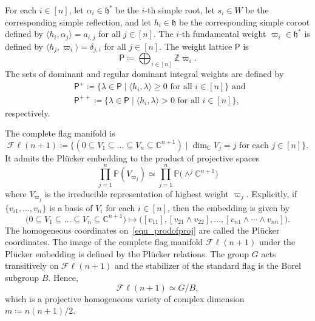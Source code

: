 \documentclass[11pt]{amsart}
\theoremstyle{plain}
\theoremstyle{definition}
\theoremstyle{remark}
\newcommand{\C}{\mathbb{C}}
\newcommand{\Z}{\mathbb{Z}}
\numberwithin{equation}{section} \numberwithin{table}{section}
\numberwithin{equation}{section}
\begin{document}
For each $i \in [n]$, let $\alpha_i \in \mathfrak{h}^*$ be the $i$-th simple root, let $s_i \in W$ be the corresponding simple reflection, and let $h_i \in \mathfrak{h}$ be the corresponding simple coroot defined by $\langle h_i, \alpha_j \rangle = a_{i,j}$ for all $j \in [n]$. The $i$-th fundamental weight $\varpi_i \in \mathfrak{h}^*$ is defined by $\langle h_j, \varpi_i \rangle = \delta_{j,i}$ for all $j \in [n]$. The weight lattice $\mathsf{P}$ is 
$$
\mathsf{P} \coloneqq \bigoplus_{i \in [n]} \Z \varpi_i.
$$
The sets of dominant and regular dominant integral weights are defined by
\begin{align*}
&\mathsf{P}^+ \coloneqq \{ \lambda \in \mathsf{P} \mid \langle h_i, \lambda  \rangle \geq 0 \mbox{ for all } i \in [n] \} \mbox{ and } \\
&\mathsf{P}^{++} \coloneqq \{ \lambda \in \mathsf{P} \mid \langle h_i, \lambda  \rangle > 0 \mbox{ for all } i \in [n] \},
\end{align*}
respectively.

The complete flag manifold is 
$$
\mathcal{F}\ell(n+1) \coloneqq \bigl\{ (0 \subseteq V_1 \subseteq \dots \subseteq V_n \subseteq \C^{n+1} ) \mid \dim_\C V_j = j \mbox{ for each $j \in [n]$} \bigr\}.
$$
It admits the Pl\"{u}cker embedding to the product of projective spaces 
\begin{equation}\label{equ_prodofproj}
\prod_{j=1}^n \mathbb{P}(V_{\varpi_j}) \simeq \prod_{j=1}^n \mathbb{P} \bigl(\wedge^j \C^{n+1}\bigr)
\end{equation}
where $V_{\varpi_j}$ is the irreducible representation of highest weight $\varpi_j$. Explicitly, if $\{v_{i1},\dots,v_{ii}\}$ is a basis of $V_i$ for each $i \in [n]$, then the embedding is given by
$$
\bigl(0 \subseteq V_1 \subseteq \dots \subseteq V_n \subseteq \C^{n+1} \bigr) \mapsto \bigl( [v_{11}], [v_{21}\wedge v_{22}], \dots, [v_{n1}\wedge\cdots\wedge v_{nn}] \bigr).
$$
The homogeneous coordinates on~\eqref{equ_prodofproj} are called the Pl\"{u}cker coordinates. The image of the complete flag manifold $\mathcal{F}\ell(n+1)$ under the Pl\"{u}cker embedding is defined by the Pl\"{u}cker relations. The group $G$ acts transitively on $\mathcal{F}\ell(n+1)$ and the stabilizer of the standard flag is the Borel subgroup $B$. Hence,
$$
\mathcal{F}\ell(n+1) \simeq G/B,
$$
which is a projective homogeneous variety of complex dimension $m \coloneqq {n(n+1)}/{2}$. 
\end{document}
